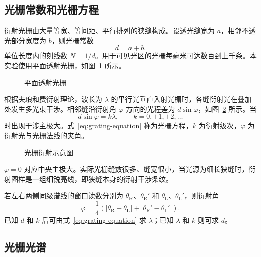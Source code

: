 \documentclass{../template/myrpt}
\begin{document}
\subsection{光栅常数和光栅方程}

衍射光栅由大量等宽、等间距、平行排列的狭缝构成。设透光缝宽为 $a$，相邻不透光部分宽度为 $b$，则光栅常数
\begin{equation}
  \label{eq:grating-constant}
  d=a+b.
\end{equation}
单位长度内的刻线数 $N=1/d$。用于可见光区的光栅每毫米可达数百到上千条。本实验使用平面透射光栅，如图~\ref{fig:grating} 所示。

\begin{figure}[!htbp]
  \centering
  
  \caption{平面透射光栅}
  \label{fig:grating}
\end{figure}

根据夫琅和费衍射理论，波长为 $\lambda$ 的平行光垂直入射光栅时，各缝衍射光在叠加处发生多光束干涉。相邻缝沿衍射角 $\varphi$ 方向的光程差为 $d\sin\varphi$，如图~\ref{fig:grating-diffraction} 所示。当
\begin{equation}
  \label{eq:grating-equation}
  d\sin\varphi=k\lambda,\qquad k=0,\pm1,\pm2,\ldots
\end{equation}
时出现干涉主极大。式~\eqref{eq:grating-equation} 称为光栅方程，$k$ 为衍射级次，$\varphi$ 为衍射光与光栅法线的夹角。

\begin{figure}[!htbp]
  \centering
  
  \caption{光栅衍射示意图}
  \label{fig:grating-diffraction}
\end{figure}

$\varphi=0$ 对应中央主极大。实际光栅缝数很多、缝宽很小，当光源为细长狭缝时，衍射图样是一组细锐亮线，即狭缝本身的衍射干涉条纹。

若左右两侧同级谱线的窗口读数分别为 $\theta_{\mathrm{R}}$、$\theta_{\mathrm{R}}'$ 和 $\theta_{\mathrm{L}}$、$\theta_{\mathrm{L}}'$，则衍射角
\begin{equation}
  \label{eq:diffraction-angle}
  \varphi=\frac{1}{4}\left(\lvert\theta_{\mathrm{R}}-\theta_{\mathrm{L}}\rvert+\lvert\theta_{\mathrm{R}}'-\theta_{\mathrm{L}}'\rvert\right).
\end{equation}
已知 $d$ 和 $k$ 后可由式~\eqref{eq:grating-equation} 求 $\lambda$；已知 $\lambda$ 和 $k$ 则可求 $d$。

\subsection{光栅光谱}
\end{document}
